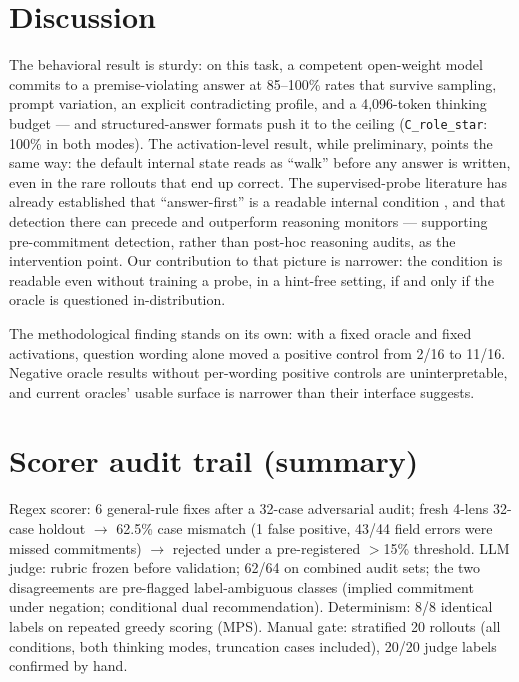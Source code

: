 \documentclass[11pt]{article}
\newcommand{\code}[1]{\texttt{#1}}
\begin{document}
\section{Discussion}

The behavioral result is sturdy: on this task, a competent open-weight
model commits to a premise-violating answer at 85--100\% rates that
survive sampling, prompt variation, an explicit contradicting profile, and
a 4{,}096-token thinking budget --- and structured-answer formats push it to the ceiling
(\code{C\_role\_star}: 100\% in both modes). The activation-level result, while preliminary, points the same way:
the default internal state reads as ``walk'' before any answer is
written, even in the rare rollouts that end up correct. The
supervised-probe literature has already established that
``answer-first'' is a readable internal condition
\citep{cox,boppana,scalena}, and that detection there can precede and
outperform reasoning monitors \citep{mirtaheri} --- supporting
pre-commitment detection, rather than post-hoc reasoning audits, as the
intervention point. Our contribution to that picture is narrower: the
condition is readable even without training a probe, in a hint-free
setting, if and only if the oracle is questioned in-distribution.

The methodological finding stands on its own: with a fixed oracle and
fixed activations, question wording alone moved a positive control from
2/16 to 11/16. Negative oracle results without per-wording positive
controls are uninterpretable, and current oracles' usable surface is
narrower than their interface suggests.

\appendix

\section{Scorer audit trail (summary)}
\label{app:audit}

Regex scorer: 6 general-rule fixes after a 32-case adversarial audit;
fresh 4-lens 32-case holdout $\rightarrow$ 62.5\% case mismatch (1 false
positive, 43/44 field errors were missed commitments) $\rightarrow$
rejected under a pre-registered $>$15\% threshold. LLM judge: rubric
frozen before validation; 62/64 on combined audit sets; the two
disagreements are pre-flagged label-ambiguous classes (implied commitment
under negation; conditional dual recommendation). Determinism: 8/8
identical labels on repeated greedy scoring (MPS). Manual gate: stratified
20 rollouts (all conditions, both thinking modes, truncation cases
included), 20/20 judge labels confirmed by hand.
\end{document}
